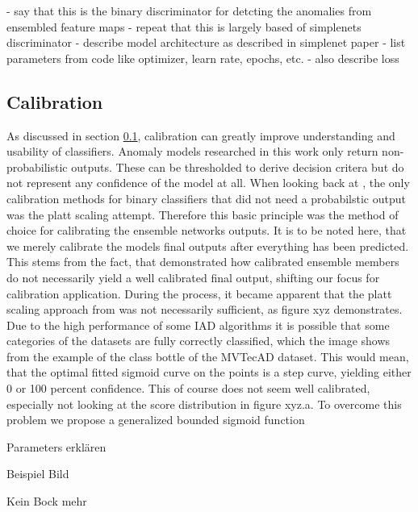 - say that this is the binary discriminator for detcting the anomalies from ensembled feature maps
- repeat that this is largely based of simplenets discriminator
- describe model architecture as described in simplenet paper
- list parameters from code like optimizer, learn rate, epochs, etc. 
- also describe loss


\subsection{Calibration}
\label{sec:Calibration}

As discussed in section \ref{sec:Calibration}, calibration can greatly improve understanding and usability of classifiers. Anomaly models researched in this work only return non-probabilistic 
outputs. These can be thresholded to derive decision critera but do not represent any confidence of the model at all. When looking back at \cite{Guo_2017_tempscalingetc}, the only calibration 
methods for binary classifiers that did not need a probabilstic output was the platt scaling attempt. Therefore this basic principle was the method of choice for calibrating the ensemble networks 
outputs. It is to be noted here, that we merely calibrate the models final outputs after everything has been predicted. This stems from the fact, that \cite{Wu_2021_shouldbecalibrated} demonstrated 
how calibrated ensemble members do not necessarily yield a well calibrated final output, shifting our focus for calibration application. During the process, it became apparent that the platt 
scaling approach from \cite{Guo_2017_tempscalingetc} was not necessarily sufficient, as figure xyz demonstrates. Due to the high performance of some IAD algorithms it is possible that some categories 
of the datasets are fully correctly classified, which the image shows from the example of the class bottle of the MVTecAD dataset. This would mean, that the optimal fitted sigmoid curve on the points 
is a step curve, yielding either 0 or 100 percent confidence. This of course does not seem well calibrated, especially not looking at the score distribution in figure xyz.a. To overcome this problem 
we propose a generalized bounded sigmoid function 


Parameters erklären

Beispiel Bild

Kein Bock mehr









